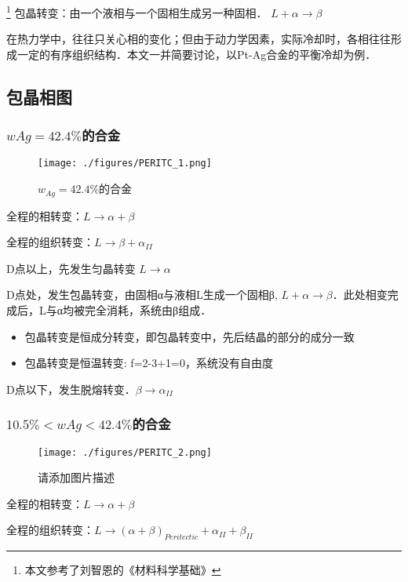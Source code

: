 
\footnote{本文参考了刘智恩的《材料科学基础》}
包晶转变：由一个液相与一个固相生成另一种固相． $L + \alpha \rightarrow \beta$

在热力学中，往往只关心相的变化；但由于动力学因素，实际冷却时，各相往往形成一定的有序组织结构．本文一并简要讨论，以Pt-Ag合金的平衡冷却为例．

\subsection{包晶相图}
\subsubsection{$wAg=42.4\%$的合金} 

\begin{figure}[ht]
\centering
\texttt{[image: ./figures/PERITC\_1.png]}
\caption{$w_{Ag}=42.4\%$的合金} \label{PERITC_fig1}
\end{figure}

全程的相转变：$L \rightarrow \alpha+\beta$

全程的组织转变：$L \rightarrow \beta + \alpha_{II}$

D点以上，先发生匀晶转变 $L \rightarrow \alpha$

D点处，发生包晶转变，由固相α与液相L生成一个固相β, $L + \alpha \rightarrow \beta$．此处相变完成后，L与α均被完全消耗，系统由β组成．
\begin{itemize}
\item 包晶转变是恒成分转变，即包晶转变中，先后结晶的部分的成分一致
\item 包晶转变是恒温转变: f=2-3+1=0，系统没有自由度
\end{itemize}

D点以下，发生脱熔转变．$\beta \rightarrow \alpha_{II}$

\subsubsection{$10.5\%<wAg<42.4\%$的合金} 
\begin{figure}[ht]
\centering
\texttt{[image: ./figures/PERITC\_2.png]}
\caption{请添加图片描述} \label{PERITC_fig2}
\end{figure}

全程的相转变：$L \rightarrow \alpha+\beta$

全程的组织转变：$L \rightarrow (\alpha+\beta)_{Peritectic} + \alpha_{II} + \beta_{II}$

